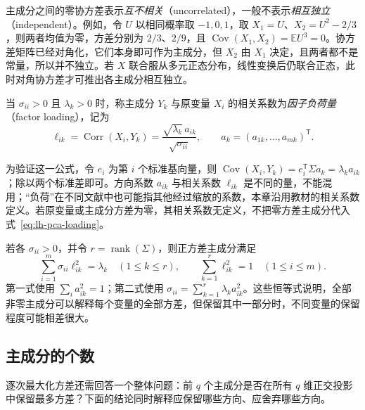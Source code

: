 主成分之间的零协方差表示\emph{互不相关}（uncorrelated），一般不表示\emph{相互独立}（independent）。例如，令 $U$ 以相同概率取 $-1,0,1$，取 $X_1=U$、$X_2=U^2-2/3$，则两者均值为零，方差分别为 $2/3$、$2/9$，且 $\operatorname{Cov}(X_1,X_2)=\mathbb E U^3=0$。协方差矩阵已经对角化，它们本身即可作为主成分，但 $X_2$ 由 $X_1$ 决定，且两者都不是常量，所以并不独立。若 $X$ 联合服从多元正态分布，线性变换后仍联合正态，此时对角协方差才可推出各主成分相互独立。

\begin{definition}[因子负荷量]
\label{def:lh-pca-loading}
当 $\sigma_{ii}>0$ 且 $\lambda_k>0$ 时，称主成分 $Y_k$ 与原变量 $X_i$ 的相关系数为\emph{因子负荷量}（factor loading），记为
\begin{equation}
\ell_{ik}=\operatorname{Corr}(X_i,Y_k)
=\frac{\sqrt{\lambda_k}\,a_{ik}}{\sqrt{\sigma_{ii}}},
\qquad a_k=(a_{1k},\ldots,a_{mk})^{\mathsf T}.
\label{eq:lh-pca-loading}
\end{equation}
\end{definition}

为验证这一公式，令 $e_i$ 为第 $i$ 个标准基向量，则 $\operatorname{Cov}(X_i,Y_k)=e_i^{\mathsf T}\Sigma a_k=\lambda_k a_{ik}$；除以两个标准差即可。方向系数 $a_{ik}$ 与相关系数 $\ell_{ik}$ 是不同的量，不能混用；“负荷”在不同文献中也可能指其他经过缩放的系数，本章沿用教材的相关系数定义。若原变量或主成分方差为零，其相关系数无定义，不把零方差主成分代入式~\eqref{eq:lh-pca-loading}。

若各 $\sigma_{ii}>0$，并令 $r=\operatorname{rank}(\Sigma)$，则正方差主成分满足
\begin{equation}
\sum_{i=1}^m\sigma_{ii}\ell_{ik}^2=\lambda_k
\quad(1\leq k\leq r),\qquad
\sum_{k=1}^r\ell_{ik}^2=1
\quad(1\leq i\leq m).
\label{eq:lh-pca-loading-identities}
\end{equation}
第一式使用 $\sum_i a_{ik}^2=1$；第二式使用 $\sigma_{ii}=\sum_{k=1}^r\lambda_k a_{ik}^2$。这些恒等式说明，全部非零主成分可以解释每个变量的全部方差，但保留其中一部分时，不同变量的保留程度可能相差很大。

\subsection{主成分的个数}
\label{subsec:lh-pca-component-count}

逐次最大化方差还需回答一个整体问题：前 $q$ 个主成分是否在所有 $q$ 维正交投影中保留最多方差？下面的结论同时解释应保留哪些方向、应舍弃哪些方向。

